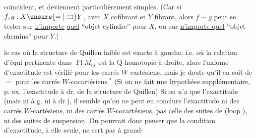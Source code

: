coïncident, et deviennent \inserted{$\unsure{=|\simeq}$} particulièrement simples. (Car si $f,g:X\unsure{=|\rightrightarrows}Y$, avec $X$ cofibrant et $Y$ fibrant, alors $f\sim g$ peut se tester sur \uline{n'importe} \uline{quel} ``objet cylindre'' pour $X$, ou sur \uline{n'importe quel} ``objet chemins'' pour $Y$.)

 le cas où la structure de Quillen faible est exacte à gauche,  i.e. où la relation d'équi pertinente dans $\operatorname{Fl}M_{cf}$ est la Q-homotopie à droite, alors l'axiome d'exactitude est vérifié pour les carrés $W$-cartésiens, mais je doute qu'il en soit de $=$ pour les carrés $W$-cocartésiens.$^{*}$
(Si on ne fait  une hypothèse supplémentaire, p. ex. l'exactitude à dr. de la structure de Quillen) Si on n'a que l'exactitude (mais ni à g. ni à dr.), il semble qu'on ne peut en conclure l'exactitude ni des carrés $W$-cartésiens, ni des carrés $W$-cocartésiens,   pas celle des suites de  (loop ), ni des suites de suspension. On pourrait donc penser que la condition d'exactitude, à elle seule, ne sert pas à grand-
